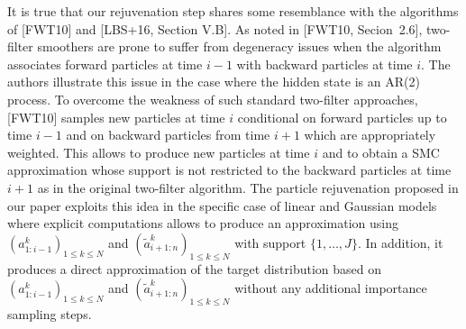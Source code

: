 {\em 

It is true that our rejuvenation step shares some resemblance with the algorithms of [FWT10] and [LBS+16, Section V.B]. As noted in [FWT10, Secion~2.6], two-filter smoothers are prone to suffer from degeneracy issues when the algorithm associates forward particles at time $i-1$ with backward particles at time $i$. The authors illustrate this issue in the case where the hidden state is an AR(2) process. To overcome the weakness of such standard two-filter approaches, [FWT10] samples new particles at time $i$ conditional on forward particles up to time $i-1$ and on backward particles from time $i+1$ which are appropriately weighted. This allows to produce new particles at time $i$ and to obtain a SMC approximation whose support is not restricted to the backward particles at time $i+1$ as in the original two-filter algorithm.  The particle rejuvenation proposed in our paper exploits this idea in the specific case of linear and Gaussian models where explicit computations allows to produce an approximation using $(a^k_{1:i-1})_{1\le k \le N}$ and $(\tilde{a}^k_{i+1:n})_{1\le k \le N}$ with support $\{1,\ldots,J\}$. In addition, it produces a direct approximation of the target distribution based on $(a^k_{1:i-1})_{1\le k \le N}$ and $(\tilde{a}^k_{i+1:n})_{1\le k \le N}$  without any additional importance sampling steps.


}

